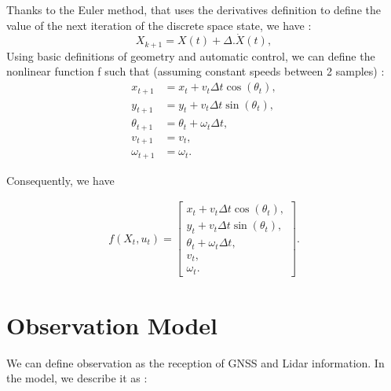 \documentclass[conference]{IEEEtran}
\begin{document}
\vspace{2mm}

\noindent Thanks to the Euler method, that uses the derivatives definition to define the value of the next iteration of the discrete space state, we have : 
\[
X_{k+1} = X(t) + \Delta.\dot{X}(t),
\]
\noindent Using basic definitions of geometry and automatic control, we can define the nonlinear function f such that (assuming constant speeds between 2 samples) : 
\[
\begin{aligned}
x_{t+1} &= x_t + v_t \Delta t \cos(\theta_t), \\
y_{t+1} &= y_t + v_t \Delta t \sin(\theta_t), \\
\theta_{t+1} &= \theta_t + \omega_t \Delta t, \\
v_{t+1} &= v_t, \\
\omega_{t+1} &= \omega_t.
\end{aligned}
\]

\noindent Consequently, we have 

\begin{align*}
    f(X_t, u_t) =
    \begin{bmatrix}
    x_t + v_t \Delta t \cos(\theta_t), \\
    y_t + v_t \Delta t \sin(\theta_t), \\
    \theta_t + \omega_t \Delta t, \\
    v_t, \\
    \omega_t.
    \end{bmatrix}.
\end{align*}


\newpage

\section{Observation Model}

\noindent We can define observation as the reception of GNSS and Lidar information. In the model, we describe it as :
\end{document}
